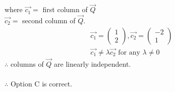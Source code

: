 \documentclass[journal]{IEEEtran}
\begin{document}
where $\vec{c_1} =$ first column of $\vec{Q}$ \\
$\vec{c_2} =$ second column of $\vec{Q}$.
\begin{align}
\vec{c_1} = \begin{pmatrix} 1 \\ 2 \end{pmatrix}, \vec{c_2} = \begin{pmatrix} -2 \\ 1 \end{pmatrix}\\
\vec{c_1} \neq \lambda \vec{c_2} \text{ for any } \lambda \neq 0
\end{align}
$\therefore$ columns of $\vec{Q}$ are linearly independent.\\\\
$\therefore$ Option C is correct.
\end{document}
